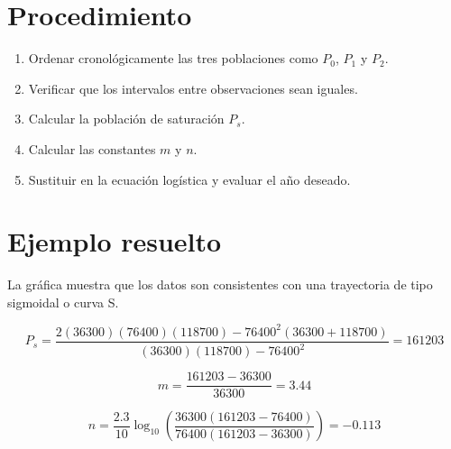 \documentclass[12pt]{article}
\begin{document}
\section{Procedimiento}
\begin{enumerate}
\item Ordenar cronológicamente las tres poblaciones como $P_0$, $P_1$ y $P_2$.
\item Verificar que los intervalos entre observaciones sean iguales.
\item Calcular la población de saturación $P_s$.
\item Calcular las constantes $m$ y $n$.
\item Sustituir en la ecuación logística y evaluar el año deseado.
\end{enumerate}

\section{Ejemplo resuelto}
\begin{center}
\end{center}

La gráfica muestra que los datos son consistentes con una trayectoria de tipo sigmoidal o curva S.

\[
P_s=\frac{2(\num{36300})(\num{76400})(\num{118700})-\num{76400}^2(\num{36300}+\num{118700})}{(\num{36300})(\num{118700})-\num{76400}^2}=\num{161203}
\]

\[
m=\frac{\num{161203}-\num{36300}}{\num{36300}}=3.44
\]

\[
n=\frac{2.3}{10}\log_{10}\left(\frac{\num{36300}(\num{161203}-\num{76400})}{\num{76400}(\num{161203}-\num{36300})}\right)=-0.113
\]
\end{document}
